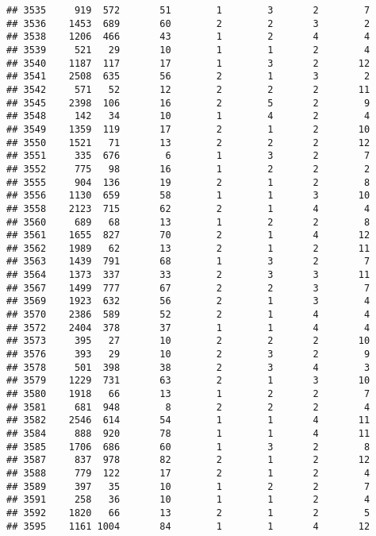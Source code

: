 \documentclass[]{article}
\begin{document}
\begin{verbatim}
## 3535     919  572       51        1        3       2        7
## 3536    1453  689       60        2        2       3        2
## 3538    1206  466       43        1        2       4        4
## 3539     521   29       10        1        1       2        4
## 3540    1187  117       17        1        3       2       12
## 3541    2508  635       56        2        1       3        2
## 3542     571   52       12        2        2       2       11
## 3545    2398  106       16        2        5       2        9
## 3548     142   34       10        1        4       2        4
## 3549    1359  119       17        2        1       2       10
## 3550    1521   71       13        2        2       2       12
## 3551     335  676        6        1        3       2        7
## 3552     775   98       16        1        2       2        2
## 3555     904  136       19        2        1       2        8
## 3556    1130  659       58        1        1       3       10
## 3558    2123  715       62        2        1       4        4
## 3560     689   68       13        1        2       2        8
## 3561    1655  827       70        2        1       4       12
## 3562    1989   62       13        2        1       2       11
## 3563    1439  791       68        1        3       2        7
## 3564    1373  337       33        2        3       3       11
## 3567    1499  777       67        2        2       3        7
## 3569    1923  632       56        2        1       3        4
## 3570    2386  589       52        2        1       4        4
## 3572    2404  378       37        1        1       4        4
## 3573     395   27       10        2        2       2       10
## 3576     393   29       10        2        3       2        9
## 3578     501  398       38        2        3       4        3
## 3579    1229  731       63        2        1       3       10
## 3580    1918   66       13        1        2       2        7
## 3581     681  948        8        2        2       2        4
## 3582    2546  614       54        1        1       4       11
## 3584     888  920       78        1        1       4       11
## 3585    1706  686       60        1        3       2        8
## 3587     837  978       82        2        1       2       12
## 3588     779  122       17        2        1       2        4
## 3589     397   35       10        1        2       2        7
## 3591     258   36       10        1        1       2        4
## 3592    1820   66       13        2        1       2        5
## 3595    1161 1004       84        1        1       4       12

\end{verbatim}
\end{document}
